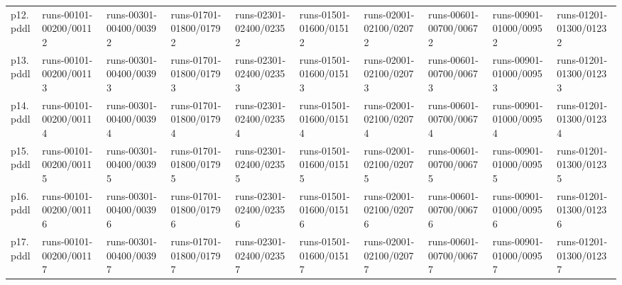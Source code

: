 \documentclass{article}
\begin{document}
\begin{tabular}{@{}lrrrrrrrrr@{}}
p12.pddl & \multicolumn{1}{|l|}{runs-00101-00200/00112} & \multicolumn{1}{|l|}{runs-00301-00400/00392} & \multicolumn{1}{|l|}{runs-01701-01800/01792} & \multicolumn{1}{|l|}{runs-02301-02400/02352} & \multicolumn{1}{|l|}{runs-01501-01600/01512} & \multicolumn{1}{|l|}{runs-02001-02100/02072} & \multicolumn{1}{|l|}{runs-00601-00700/00672} & \multicolumn{1}{|l|}{runs-00901-01000/00952} & \multicolumn{1}{|l|}{runs-01201-01300/01232} \\
p13.pddl & \multicolumn{1}{|l|}{runs-00101-00200/00113} & \multicolumn{1}{|l|}{runs-00301-00400/00393} & \multicolumn{1}{|l|}{runs-01701-01800/01793} & \multicolumn{1}{|l|}{runs-02301-02400/02353} & \multicolumn{1}{|l|}{runs-01501-01600/01513} & \multicolumn{1}{|l|}{runs-02001-02100/02073} & \multicolumn{1}{|l|}{runs-00601-00700/00673} & \multicolumn{1}{|l|}{runs-00901-01000/00953} & \multicolumn{1}{|l|}{runs-01201-01300/01233} \\
p14.pddl & \multicolumn{1}{|l|}{runs-00101-00200/00114} & \multicolumn{1}{|l|}{runs-00301-00400/00394} & \multicolumn{1}{|l|}{runs-01701-01800/01794} & \multicolumn{1}{|l|}{runs-02301-02400/02354} & \multicolumn{1}{|l|}{runs-01501-01600/01514} & \multicolumn{1}{|l|}{runs-02001-02100/02074} & \multicolumn{1}{|l|}{runs-00601-00700/00674} & \multicolumn{1}{|l|}{runs-00901-01000/00954} & \multicolumn{1}{|l|}{runs-01201-01300/01234} \\
p15.pddl & \multicolumn{1}{|l|}{runs-00101-00200/00115} & \multicolumn{1}{|l|}{runs-00301-00400/00395} & \multicolumn{1}{|l|}{runs-01701-01800/01795} & \multicolumn{1}{|l|}{runs-02301-02400/02355} & \multicolumn{1}{|l|}{runs-01501-01600/01515} & \multicolumn{1}{|l|}{runs-02001-02100/02075} & \multicolumn{1}{|l|}{runs-00601-00700/00675} & \multicolumn{1}{|l|}{runs-00901-01000/00955} & \multicolumn{1}{|l|}{runs-01201-01300/01235} \\
p16.pddl & \multicolumn{1}{|l|}{runs-00101-00200/00116} & \multicolumn{1}{|l|}{runs-00301-00400/00396} & \multicolumn{1}{|l|}{runs-01701-01800/01796} & \multicolumn{1}{|l|}{runs-02301-02400/02356} & \multicolumn{1}{|l|}{runs-01501-01600/01516} & \multicolumn{1}{|l|}{runs-02001-02100/02076} & \multicolumn{1}{|l|}{runs-00601-00700/00676} & \multicolumn{1}{|l|}{runs-00901-01000/00956} & \multicolumn{1}{|l|}{runs-01201-01300/01236} \\
p17.pddl & \multicolumn{1}{|l|}{runs-00101-00200/00117} & \multicolumn{1}{|l|}{runs-00301-00400/00397} & \multicolumn{1}{|l|}{runs-01701-01800/01797} & \multicolumn{1}{|l|}{runs-02301-02400/02357} & \multicolumn{1}{|l|}{runs-01501-01600/01517} & \multicolumn{1}{|l|}{runs-02001-02100/02077} & \multicolumn{1}{|l|}{runs-00601-00700/00677} & \multicolumn{1}{|l|}{runs-00901-01000/00957} & \multicolumn{1}{|l|}{runs-01201-01300/01237} \\

\end{tabular}
\end{document}
